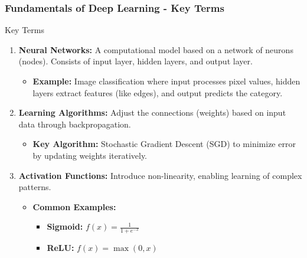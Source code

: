 \documentclass{beamer}
\begin{document}
\begin{frame}[fragile]
    \frametitle{Fundamentals of Deep Learning - Key Terms}
    \begin{block}{Key Terms}
        \begin{enumerate}
            \item \textbf{Neural Networks:}
                A computational model based on a network of neurons (nodes). Consists of input layer, hidden layers, and output layer.
                \begin{itemize}
                    \item \textbf{Example:} Image classification where input processes pixel values, hidden layers extract features (like edges), and output predicts the category.
                \end{itemize}
            \item \textbf{Learning Algorithms:}
                Adjust the connections (weights) based on input data through backpropagation.
                \begin{itemize}
                    \item \textbf{Key Algorithm:} Stochastic Gradient Descent (SGD) to minimize error by updating weights iteratively.
                \end{itemize}
            \item \textbf{Activation Functions:}
                Introduce non-linearity, enabling learning of complex patterns.
                \begin{itemize}
                    \item \textbf{Common Examples:}
                        \begin{itemize}
                            \item \textbf{Sigmoid:} $f(x) = \frac{1}{1 + e^{-x}}$
                            \item \textbf{ReLU:} $f(x) = \max(0, x)$
                        \end{itemize}
                \end{itemize}
        \end{enumerate}
    \end{block}
\end{frame}
\end{document}
